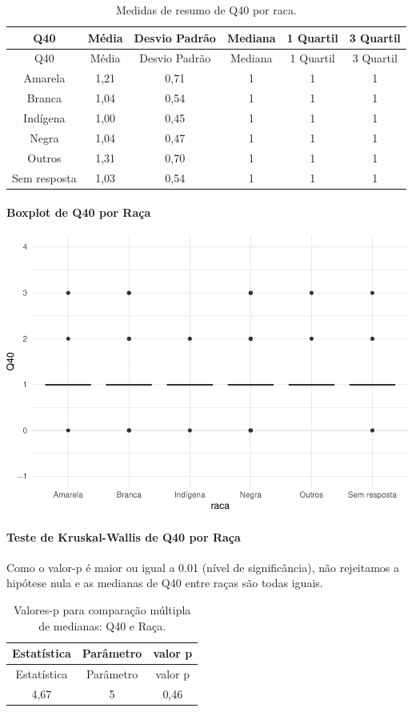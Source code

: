 \documentclass[]{article}
\let\oldparagraph\paragraph
\renewcommand{\paragraph}[1]{\oldparagraph{#1}\mbox{}}
\begin{document}
\begin{longtable}[]{@{}cccccc@{}}
\caption{\label{tab:unnamed-chunk-1581}Medidas de resumo de Q40 por raca.}\tabularnewline
\toprule
Q40 & Média & Desvio Padrão & Mediana & 1 Quartil & 3 Quartil\tabularnewline
\midrule
\endfirsthead
\toprule
Q40 & Média & Desvio Padrão & Mediana & 1 Quartil & 3 Quartil\tabularnewline
\midrule
\endhead
Amarela & 1,21 & 0,71 & 1 & 1 & 1\tabularnewline
Branca & 1,04 & 0,54 & 1 & 1 & 1\tabularnewline
Indígena & 1,00 & 0,45 & 1 & 1 & 1\tabularnewline
Negra & 1,04 & 0,47 & 1 & 1 & 1\tabularnewline
Outros & 1,31 & 0,70 & 1 & 1 & 1\tabularnewline
Sem resposta & 1,03 & 0,54 & 1 & 1 & 1\tabularnewline
\bottomrule
\end{longtable}

\hypertarget{boxplot-de-q40-por-rauxe7a}{%
\paragraph{Boxplot de Q40 por Raça}\label{boxplot-de-q40-por-rauxe7a}}

\begin{center}\includegraphics[width=0.75\linewidth]{relatorio_covid19_files/figure-latex/unnamed-chunk-1582-1} \end{center}

\hypertarget{teste-de-kruskal-wallis-de-q40-por-rauxe7a}{%
\paragraph{Teste de Kruskal-Wallis de Q40 por Raça}\label{teste-de-kruskal-wallis-de-q40-por-rauxe7a}}

Como o valor-p é maior ou igual a 0.01 (nível de significância), não rejeitamos a hipótese nula e as medianas de Q40 entre raças são todas iguais.

\begin{longtable}[]{@{}ccc@{}}
\caption{\label{tab:unnamed-chunk-1584}Valores-p para comparação múltipla de medianas: Q40 e Raça.}\tabularnewline
\toprule
Estatística & Parâmetro & valor p\tabularnewline
\midrule
\endfirsthead
\toprule
Estatística & Parâmetro & valor p\tabularnewline
\midrule
\endhead
4,67 & 5 & 0,46\tabularnewline
\bottomrule
\end{longtable}
\end{document}
